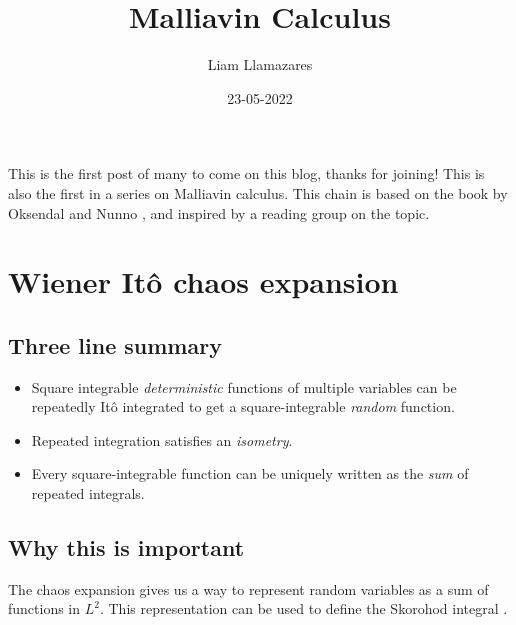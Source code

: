 \documentclass[13pt]{article}
\begin{document}
\title{Malliavin Calculus}
\author{Liam Llamazares}
\date{23-05-2022}
\maketitle
This is the first post of many to come on this blog, thanks for joining! This is also the first in a series on Malliavin calculus. This chain is
based on the book by Oksendal and Nunno \cite{nunno2008malliavin}, and inspired by a reading group on the topic.
\section{Wiener Itô chaos expansion}
\subsection{Three line summary}
\begin{itemize}
	\item Square integrable  \textit{deterministic} functions of multiple variables can be repeatedly Itô integrated to get a square-integrable \emph{random} function.
	\item  Repeated integration satisfies an \textit{isometry}.
	\item Every square-integrable function can be uniquely written as the \textit{sum} of repeated integrals.
\end{itemize}
\subsection{Why this is important}
The chaos expansion gives us a way to represent random variables as a sum of functions in $L^2$. This representation can be used to define the Skorohod integral \cite{Skorohodblog}.
\end{document}
